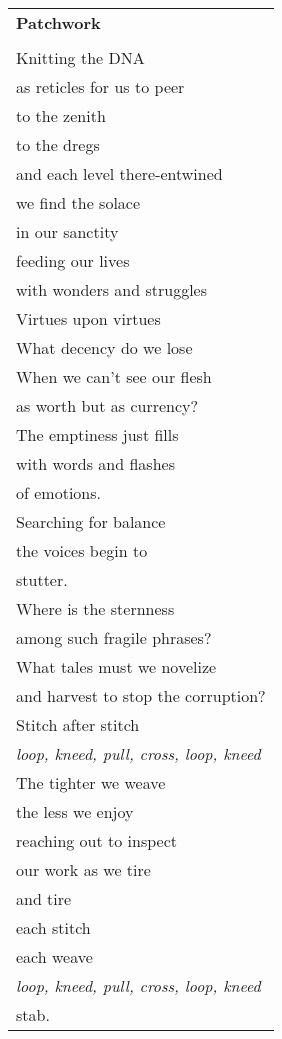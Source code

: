 \documentclass{article}
\begin{document}
\begin{center}
\begin{tabular}{l}
\textbf{Patchwork} \\
\\
Knitting the DNA \\
as reticles for us to peer \\
to the zenith \\
to the dregs \\
and each level there-entwined \\
we find the solace \\
in our sanctity \\
feeding our lives \\
with wonders and struggles \\
Virtues upon virtues \\
What decency do we lose \\
When we can't see our flesh \\
as worth but as currency? \\
The emptiness just fills \\
with words and flashes \\
of emotions. \\
Searching for balance \\
the voices begin to \\
stutter. \\
Where is the sternness \\
among such fragile phrases? \\
What tales must we novelize \\
and harvest to stop the corruption? \\
Stitch after stitch \\
\textit{loop, kneed, pull, cross, loop, kneed} \\
The tighter we weave \\
the less we enjoy \\
reaching out to inspect \\
our work as we tire \\
and tire \\
each stitch \\
each weave \\
\textit{loop, kneed, pull, cross, loop, kneed} \\
stab. \\
\end{tabular}
\end{center}
\end{document}
